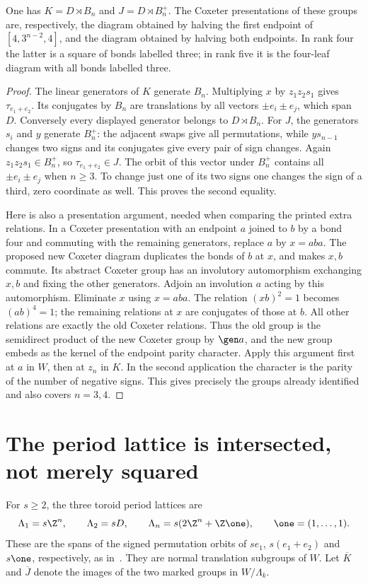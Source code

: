 \begin{lemma}\label{NA.universal}
One has $K=D\rtimes B_n$ and $J=D\rtimes B_n^+$.
The Coxeter presentations of these groups are, respectively, the
diagram obtained by halving the first endpoint of
$[4,3^{n-2},4]$, and the diagram obtained by halving both endpoints.
In rank four the latter is a square of bonds labelled three;
in rank five it is the four-leaf diagram with all bonds labelled three.
\end{lemma}
\begin{proof}
The linear generators of $K$ generate $B_n$. Multiplying $x$ by
$z_1z_2s_1$ gives $\tau_{e_1+e_2}$. Its conjugates by $B_n$
are translations by all vectors $\pm e_i\pm e_j$, which span $D$.
Conversely every displayed generator belongs to $D\rtimes B_n$.
For $J$, the generators $s_i$ and $y$ generate $B_n^+$: the
adjacent swaps give all permutations, while $ys_{n-1}$ changes
two signs and its conjugates give every pair of sign changes.
Again $z_1z_2s_1\in B_n^+$, so $\tau_{e_1+e_2}\in J$.
The orbit of this vector under $B_n^+$ contains all
$\pm e_i\pm e_j$ when $n\ge3$. To change just one of its two
signs one changes the sign of a third, zero coordinate as well.
This proves the second equality.

Here is also a presentation argument, needed when comparing the
printed extra relations. In a Coxeter presentation with an endpoint
$a$ joined to $b$ by a bond four and commuting with the remaining
generators, replace $a$ by $x=aba$. The proposed new Coxeter
diagram duplicates the bonds of $b$ at $x$, and makes $x,b$ commute.
Its abstract Coxeter group has an involutory automorphism exchanging
$x,b$ and fixing the other generators. Adjoin an involution $a$
acting by this automorphism. Eliminate $x$ using $x=aba$.
The relation $(xb)^2=1$ becomes $(ab)^4=1$; the remaining
relations at $x$ are conjugates of those at $b$. All other
relations are exactly the old Coxeter relations. Thus the old
group is the semidirect product of the new Coxeter group by
$\gen a$, and the new group embeds as the kernel of the endpoint
parity character. Apply this argument first at $a$ in $W$, then
at $z_n$ in $K$. In the second application the character is the
parity of the number of negative signs. This gives precisely
the groups already identified and also covers $n=3,4$.
\end{proof}

\section{The period lattice is intersected, not merely squared}
For $s\ge2$, the three toroid period lattices are
\[
 \Lambda_1=s\Z^n,\qquad \Lambda_2=sD,\qquad
 \Lambda_n=s(2\Z^n+\Z\one),\qquad \one=(1,\ldots,1).
\]
These are the spans of the signed permutation orbits of
$se_1$, $s(e_1+e_2)$ and $s\one$, respectively, as in~\cite{PT}.
They are normal translation subgroups of $W$.
Let $\overline K$ and $\overline J$ denote the images of the two
marked groups in $W/\Lambda_k$.


